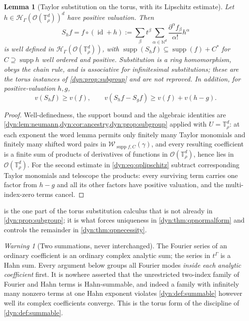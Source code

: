 \documentclass[11pt,letterpaper]{article}
\newtheorem{lemma}[lemma]{Lemma}
\theoremstyle{definition}
\theoremstyle{remark}
\newtheorem{warning}[warning]{Warning}
\newcommand{\N}{\mathbb N}
\newcommand{\HH}{\mathscr H}
\newcommand{\OO}{\mathcal O}
\newcommand{\id}{\operatorname{id}}
\newcommand{\supp}{\operatorname{supp}}
\newcommand{\word}{\mathcal W}
\newcommand{\TT}{\mathbb T}
\newcommand{\strip}{\OO(\TT^{d}_{\rho})}
\numberwithin{equation}{section}
\begin{document}
\begin{lemma}[Taylor substitution on the torus, with its Lipschitz
estimate]\label{dyn:lem:qpsubstitution}
Let $h\in\HH_\Gamma(\strip)^{d}$ have positive valuation. Then
\begin{equation}\label{dyn:eq:qpsubstitution}
 S_hf=f\circ(\id+h)
 :=\sum_\beta t^{\beta}\sum_{\alpha\in\N^{d}}
 \frac{\partial^{\alpha}f_\beta}{\alpha!}h^{\alpha}
\end{equation}
is well defined in $\HH_\Gamma(\strip)$, with
$\supp(S_hf)\subseteq\supp(f)+C^{*}$ for $C\supseteq\supp h$ well ordered
and positive. Substitution is a ring homomorphism, obeys the chain rule,
and is associative for infinitesimal substitutions; these are the torus
instances of \cref{dyn:prop:subgroup} and are not reproved. In addition,
for positive-valuation $h,g$,
\begin{equation}\label{dyn:eq:qplipschitz}
 v(S_hf)\ge v(f),\qquad
 v(S_hf-S_gf)\ge v(f)+v(h-g).
\end{equation}
\end{lemma}
\begin{proof}
Well-definedness, the support bound and the algebraic identities are
\cref{dyn:lem:neumann,dyn:cor:ancestry,dyn:prop:subgroup} applied with
$U=\TT^{d}_\rho$: at each exponent the word lemma permits only finitely
many Taylor monomials and finitely many shifted word pairs in
$\word_{\supp f,C}(\gamma)$, and every resulting coefficient is a finite
sum of products of derivatives of functions in $\strip$, hence lies in $\strip$. For the
second estimate in \eqref{dyn:eq:qplipschitz} subtract corresponding Taylor
monomials and telescope the products: every surviving term carries one
factor from $h-g$ and all its other factors have positive valuation, and
the multi-index-zero terms cancel.
\end{proof}

 is the one part of the torus substitution
calculus that is not already in \cref{dyn:prop:subgroup}; it is what
forces uniqueness in \cref{dyn:thm:qpnormalform} and controls the remainder
in \cref{dyn:thm:qpnecessity}.

\begin{warning}[Two summations, never interchanged]\label{dyn:warn:qptwosums}
The Fourier series of an ordinary coefficient is an ordinary complex
analytic sum; the series in $t^{\Gamma}$ is a Hahn sum. Every argument
below groups all Fourier modes \emph{inside each analytic coefficient}
first. It is nowhere asserted that the unrestricted two-index family of
Fourier and Hahn terms is Hahn-summable, and indeed a family with
infinitely many nonzero terms at one Hahn exponent violates
\cref{dyn:def:summable} however well its complex coefficients converge.
This is the torus form of the discipline of \cref{dyn:def:summable}.
\end{warning}
\end{document}
